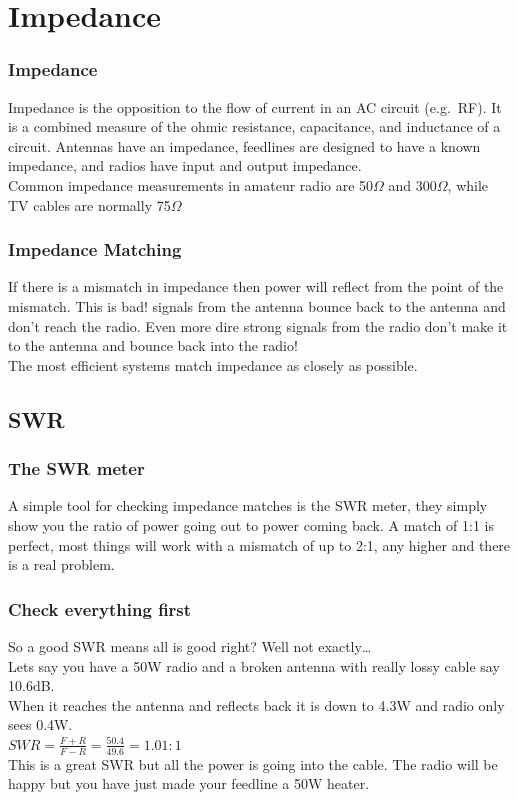 \documentclass[10pt, handout]{beamer}
\begin{document}
\section{Impedance}

\begin{frame}
\frametitle{Impedance}
Impedance is the opposition to the flow of current in an AC circuit (e.g.\ RF). It is a combined measure of the ohmic resistance, capacitance, and inductance of a circuit. Antennas have an impedance, feedlines are designed to have a known impedance, and radios have input and output impedance.\\
Common impedance measurements in amateur radio are 50$\Omega$ and 300$\Omega$, while TV cables are normally 75$\Omega$ 
\end{frame}

\begin{frame}
\frametitle{Impedance Matching}
If there is a mismatch in impedance then power will reflect from the point of the mismatch. This is bad! signals from the antenna bounce back to the antenna and don't reach the radio. Even more dire strong signals from the radio don't make it to the antenna and bounce back into the radio!\\
The most efficient systems match impedance as closely as possible.
\end{frame}

\subsection{SWR}

\begin{frame}
\frametitle{The SWR meter}
A simple tool for checking impedance matches is the SWR meter, they simply show you the ratio of power going out to power coming back. A match of 1:1 is perfect, most things will work with a mismatch of up to 2:1, any higher and there is a real problem.
\end{frame}

\begin{frame}
\frametitle{Check everything first}
So a good SWR means all is good right? \pause Well not exactly\ldots \\\pause
Lets say you have a 50W radio and a broken antenna with really lossy cable say 10.6dB.\\
When it reaches the antenna and reflects back it is down to 4.3W and radio only sees 0.4W.\\
$SWR=\frac{F+R}{F-R}=\frac{50.4}{49.6}=1.01:1$\\
This is a great SWR but all the power is going into the cable. The radio will be happy but you have just made your feedline a 50W heater.
\end{frame}
\end{document}
